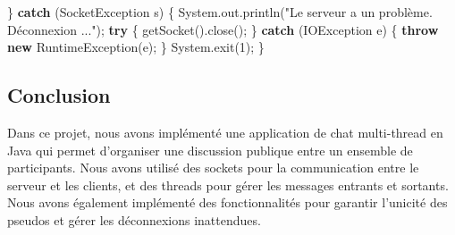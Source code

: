 \documentclass[
]{article}
\newenvironment{Shaded}{}{}
\newcommand{\BuiltInTok}[1]{#1}
\newcommand{\DecValTok}[1]{\textcolor[rgb]{0.25,0.63,0.44}{#1}}
\newcommand{\FunctionTok}[1]{\textcolor[rgb]{0.02,0.16,0.49}{#1}}
\newcommand{\KeywordTok}[1]{\textcolor[rgb]{0.00,0.44,0.13}{\textbf{#1}}}
\newcommand{\NormalTok}[1]{#1}
\newcommand{\StringTok}[1]{\textcolor[rgb]{0.25,0.44,0.63}{#1}}
\begin{document}
\begin{Shaded}
\begin{Highlighting}[]
\NormalTok{\} }\KeywordTok{catch}\NormalTok{ (}\BuiltInTok{SocketException}\NormalTok{ s) \{}
    \BuiltInTok{System}\NormalTok{.}\FunctionTok{out}\NormalTok{.}\FunctionTok{println}\NormalTok{(}\StringTok{"Le serveur a un problème. Déconnexion ..."}\NormalTok{);}
    \KeywordTok{try}\NormalTok{ \{}
        \FunctionTok{getSocket}\NormalTok{().}\FunctionTok{close}\NormalTok{();}
\NormalTok{    \} }\KeywordTok{catch}\NormalTok{ (}\BuiltInTok{IOException}\NormalTok{ e) \{}
        \KeywordTok{throw} \KeywordTok{new} \BuiltInTok{RuntimeException}\NormalTok{(e);}
\NormalTok{    \}}
    \BuiltInTok{System}\NormalTok{.}\FunctionTok{exit}\NormalTok{(}\DecValTok{1}\NormalTok{);}
\NormalTok{\}}
\end{Highlighting}
\end{Shaded}

\hypertarget{conclusion}{%
\subsection{Conclusion}\label{conclusion}}

Dans ce projet, nous avons implémenté une application de chat
multi-thread en Java qui permet d'organiser une discussion publique
entre un ensemble de participants. Nous avons utilisé des sockets pour
la communication entre le serveur et les clients, et des threads pour
gérer les messages entrants et sortants. Nous avons également implémenté
des fonctionnalités pour garantir l'unicité des pseudos et gérer les
déconnexions inattendues.
\end{document}
